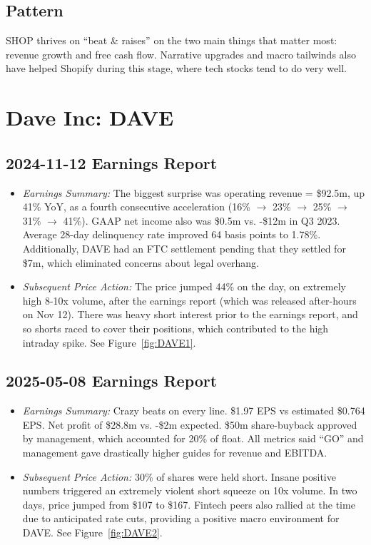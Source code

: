 \documentclass[11pt]{article}
\begin{document}
    \subsection{Pattern}
        SHOP thrives on ``beat \& raises'' on the two main things that matter most: revenue growth and free cash flow. Narrative upgrades and macro tailwinds also have helped Shopify during this stage, where tech stocks tend to do very well.
\section{Dave Inc: DAVE}
    \subsection{2024-11-12 Earnings Report}
        \begin{itemize}
            \item \textit{Earnings Summary:} The biggest surprise was operating revenue = \$92.5m, up 41\% YoY, as a fourth consecutive acceleration (16\% $\rightarrow$ 23\% $\rightarrow$ 25\% $\rightarrow$ 31\% $\rightarrow$ 41\%). GAAP net income also was \$0.5m vs. -\$12m in Q3 2023. Average 28-day delinquency rate improved 64 basis points to 1.78\%. Additionally, DAVE had an FTC settlement pending that they settled for \$7m, which eliminated concerns about legal overhang.
            \item \textit{Subsequent Price Action:} The price jumped 44\% on the day, on extremely high 8-10x volume, after the earnings report (which was released after-hours on Nov 12). There was heavy short interest prior to the earnings report, and so shorts raced to cover their positions, which contributed to the high intraday spike. See Figure~\ref{fig:DAVE1}.
        \end{itemize}
    \subsection{2025-05-08 Earnings Report}
        \begin{itemize}
            \item \textit{Earnings Summary:} Crazy beats on every line. \$1.97 EPS vs estimated \$0.764 EPS. Net profit of \$28.8m vs. -\$2m expected. \$50m share-buyback approved by management, which accounted for 20\% of float. All metrics said ``GO'' and management gave drastically higher guides for revenue and EBITDA.
            \item \textit{Subsequent Price Action:} 30\% of shares were held short. Insane positive numbers triggered an extremely violent short squeeze on 10x volume. In two days, price jumped from \$107 to \$167. Fintech peers also rallied at the time due to anticipated rate cuts, providing a positive macro environment for DAVE. See Figure~\ref{fig:DAVE2}.
        \end{itemize}
\end{document}
